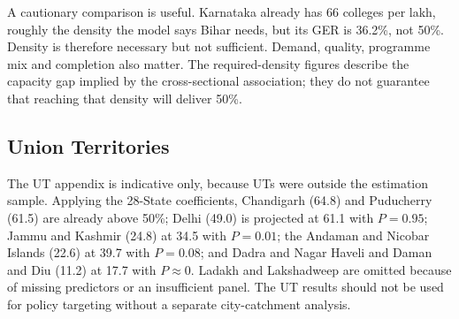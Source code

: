 A cautionary comparison is useful. Karnataka already has 66 colleges per lakh, roughly the density the model says Bihar needs, but its GER is 36.2\%, not 50\%. Density is therefore necessary but not sufficient. Demand, quality, programme mix and completion also matter. The required-density figures describe the capacity gap implied by the cross-sectional association; they do not guarantee that reaching that density will deliver 50\%.

\subsection{Union Territories}

The UT appendix is indicative only, because UTs were outside the estimation sample. Applying the 28-State coefficients, Chandigarh (64.8) and Puducherry (61.5) are already above 50\%; Delhi (49.0) is projected at 61.1 with \(P = 0.95\); Jammu and Kashmir (24.8) at 34.5 with \(P = 0.01\); the Andaman and Nicobar Islands (22.6) at 39.7 with \(P = 0.08\); and Dadra and Nagar Haveli and Daman and Diu (11.2) at 17.7 with \(P \approx 0\). Ladakh and Lakshadweep are omitted because of missing predictors or an insufficient panel. The UT results should not be used for policy targeting without a separate city-catchment analysis.
